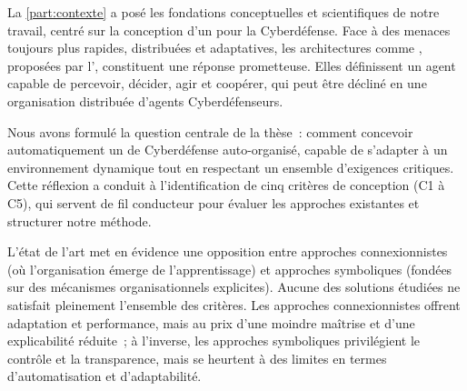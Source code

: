 La \autoref{part:contexte} a posé les fondations conceptuelles et scientifiques de notre travail, centré sur la conception d'un  pour la Cyberdéfense. Face à des menaces toujours plus rapides, distribuées et adaptatives, les architectures comme , proposées par l', constituent une réponse prometteuse. Elles définissent un agent capable de percevoir, décider, agir et coopérer, qui peut être décliné en une organisation distribuée d'agents Cyberdéfenseurs.

Nous avons formulé la question centrale de la thèse~: comment concevoir automatiquement un  de Cyberdéfense auto-organisé, capable de s'adapter à un environnement dynamique tout en respectant un ensemble d'exigences critiques. Cette réflexion a conduit à l'identification de cinq critères de conception (C1 à C5), qui servent de fil conducteur pour évaluer les approches existantes et structurer notre méthode.

L'état de l'art met en évidence une opposition entre approches connexionnistes (où l'organisation émerge de l'apprentissage) et approches symboliques (fondées sur des mécanismes organisationnels explicites). Aucune des solutions étudiées ne satisfait pleinement l'ensemble des critères. Les approches connexionnistes offrent adaptation et performance, mais au prix d'une moindre maîtrise et d'une explicabilité réduite~; à l'inverse, les approches symboliques privilégient le contrôle et la transparence, mais se heurtent à des limites en termes d'automatisation et d'adaptabilité.

